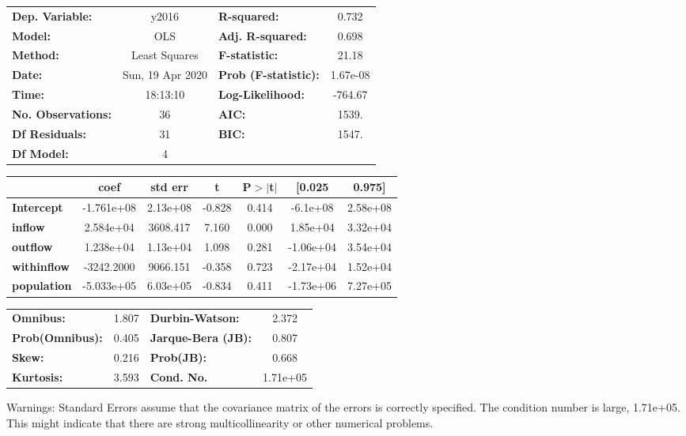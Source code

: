 \begin{center}
\begin{tabular}{lclc}
\toprule
\textbf{Dep. Variable:}    &      y2016       & \textbf{  R-squared:         } &     0.732   \\
\textbf{Model:}            &       OLS        & \textbf{  Adj. R-squared:    } &     0.698   \\
\textbf{Method:}           &  Least Squares   & \textbf{  F-statistic:       } &     21.18   \\
\textbf{Date:}             & Sun, 19 Apr 2020 & \textbf{  Prob (F-statistic):} &  1.67e-08   \\
\textbf{Time:}             &     18:13:10     & \textbf{  Log-Likelihood:    } &   -764.67   \\
\textbf{No. Observations:} &          36      & \textbf{  AIC:               } &     1539.   \\
\textbf{Df Residuals:}     &          31      & \textbf{  BIC:               } &     1547.   \\
\textbf{Df Model:}         &           4      & \textbf{                     } &             \\
\bottomrule
\end{tabular}
\begin{tabular}{lcccccc}
                    & \textbf{coef} & \textbf{std err} & \textbf{t} & \textbf{P$> |$t$|$} & \textbf{[0.025} & \textbf{0.975]}  \\
\midrule
\textbf{Intercept}  &   -1.761e+08  &     2.13e+08     &    -0.828  &         0.414        &     -6.1e+08    &     2.58e+08     \\
\textbf{inflow}     &    2.584e+04  &     3608.417     &     7.160  &         0.000        &     1.85e+04    &     3.32e+04     \\
\textbf{outflow}    &    1.238e+04  &     1.13e+04     &     1.098  &         0.281        &    -1.06e+04    &     3.54e+04     \\
\textbf{withinflow} &   -3242.2000  &     9066.151     &    -0.358  &         0.723        &    -2.17e+04    &     1.52e+04     \\
\textbf{population} &   -5.033e+05  &     6.03e+05     &    -0.834  &         0.411        &    -1.73e+06    &     7.27e+05     \\
\bottomrule
\end{tabular}
\begin{tabular}{lclc}
\textbf{Omnibus:}       &  1.807 & \textbf{  Durbin-Watson:     } &    2.372  \\
\textbf{Prob(Omnibus):} &  0.405 & \textbf{  Jarque-Bera (JB):  } &    0.807  \\
\textbf{Skew:}          &  0.216 & \textbf{  Prob(JB):          } &    0.668  \\
\textbf{Kurtosis:}      &  3.593 & \textbf{  Cond. No.          } & 1.71e+05  \\
\bottomrule
\end{tabular}
\end{center}

Warnings: \newline
 [1] Standard Errors assume that the covariance matrix of the errors is correctly specified. \newline
 [2] The condition number is large, 1.71e+05. This might indicate that there are \newline
 strong multicollinearity or other numerical problems.